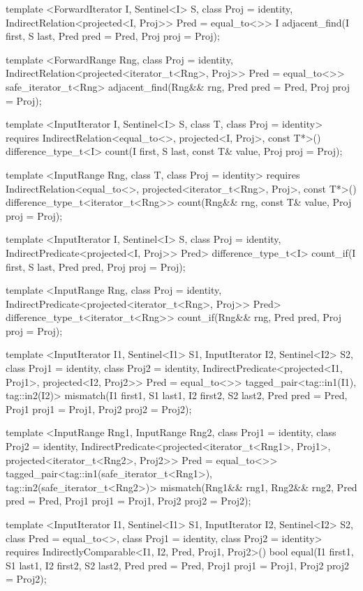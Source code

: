 \begin{codeblock}
{{{{  template <ForwardIterator I, Sentinel<I> S, class Proj = identity,
      IndirectRelation<projected<I, Proj>> Pred = equal_to<>>
    I
      adjacent_find(I first, S last, Pred pred = Pred{},
                    Proj proj = Proj{});

  template <ForwardRange Rng, class Proj = identity,
      IndirectRelation<projected<iterator_t<Rng>, Proj>> Pred = equal_to<>>
    safe_iterator_t<Rng>
      adjacent_find(Rng&& rng, Pred pred = Pred{}, Proj proj = Proj{});

  template <InputIterator I, Sentinel<I> S, class T, class Proj = identity>
    requires IndirectRelation<equal_to<>, projected<I, Proj>, const T*>()
    difference_type_t<I>
      count(I first, S last, const T& value, Proj proj = Proj{});

  template <InputRange Rng, class T, class Proj = identity>
    requires IndirectRelation<equal_to<>, projected<iterator_t<Rng>, Proj>, const T*>()
    difference_type_t<iterator_t<Rng>>
      count(Rng&& rng, const T& value, Proj proj = Proj{});

  template <InputIterator I, Sentinel<I> S, class Proj = identity,
      IndirectPredicate<projected<I, Proj>> Pred>
    difference_type_t<I>
      count_if(I first, S last, Pred pred, Proj proj = Proj{});

  template <InputRange Rng, class Proj = identity,
      IndirectPredicate<projected<iterator_t<Rng>, Proj>> Pred>
    difference_type_t<iterator_t<Rng>>
      count_if(Rng&& rng, Pred pred, Proj proj = Proj{});

  template <InputIterator I1, Sentinel<I1> S1, InputIterator I2, Sentinel<I2> S2,
      class Proj1 = identity, class Proj2 = identity,
      IndirectPredicate<projected<I1, Proj1>, projected<I2, Proj2>> Pred = equal_to<>>
    tagged_pair<tag::in1(I1), tag::in2(I2)>
      mismatch(I1 first1, S1 last1, I2 first2, S2 last2, Pred pred = Pred{},
               Proj1 proj1 = Proj1{}, Proj2 proj2 = Proj2{});

  template <InputRange Rng1, InputRange Rng2,
      class Proj1 = identity, class Proj2 = identity,
      IndirectPredicate<projected<iterator_t<Rng1>, Proj1>,
        projected<iterator_t<Rng2>, Proj2>> Pred = equal_to<>>
    tagged_pair<tag::in1(safe_iterator_t<Rng1>),
                tag::in2(safe_iterator_t<Rng2>)>
      mismatch(Rng1&& rng1, Rng2&& rng2, Pred pred = Pred{},
               Proj1 proj1 = Proj1{}, Proj2 proj2 = Proj2{});

  template <InputIterator I1, Sentinel<I1> S1, InputIterator I2, Sentinel<I2> S2,
      class Pred = equal_to<>, class Proj1 = identity, class Proj2 = identity>
    requires IndirectlyComparable<I1, I2, Pred, Proj1, Proj2>()
    bool equal(I1 first1, S1 last1, I2 first2, S2 last2,
               Pred pred = Pred{},
               Proj1 proj1 = Proj1{}, Proj2 proj2 = Proj2{});

}}}}
\end{codeblock}
